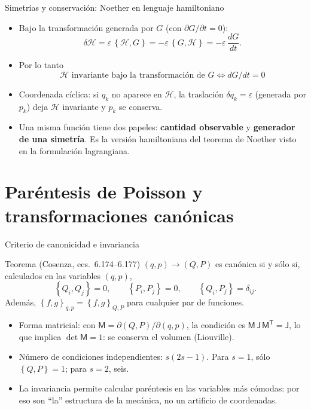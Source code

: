 \documentclass[spanish]{beamer}
\newcommand{\Ham}{\mathcal{H}}
\newcommand{\pb}[2]{\left\{#1,#2\right\}}   %
\newcommand{\J}{\mathsf{J}}                  %
\begin{document}
\begin{frame}{Simetrías y conservación: Noether en lenguaje hamiltoniano}
\begin{itemize}
  \item<1-> Bajo la transformación generada por $G$ (con $\partial G/\partial t = 0$):
  \[
    \delta\Ham = \varepsilon\,\pb{\Ham}{G} = -\varepsilon\,\pb{G}{\Ham}
               = -\varepsilon\,\frac{dG}{dt} .
  \]
  \item<2-> Por lo tanto
  \[
    \boxed{\ \Ham \text{ invariante bajo la transformación de } G
    \iff dG/dt = 0\ }
  \]
  \item<3-> Coordenada cíclica: si $q_k$ no aparece en $\Ham$, la traslación
        $\delta q_k=\varepsilon$ (generada por $p_k$) deja $\Ham$ invariante y
        $p_k$ se conserva.
  \item<4-> Una misma función tiene dos papeles: \textbf{cantidad observable}
        y \textbf{generador de una simetría}. Es la versión hamiltoniana del
        teorema de Noether visto en la formulación lagrangiana.
\end{itemize}
\end{frame}

\section{Paréntesis de Poisson y transformaciones canónicas}

\begin{frame}{Criterio de canonicidad e invariancia}
\begin{block}{Teorema (Cosenza, ecs.~6.174--6.177)}
$(q,p)\to(Q,P)$ es canónica si y sólo si, calculados en las variables $(q,p)$,
\[
  \pb{Q_i}{Q_j} = 0, \qquad \pb{P_i}{P_j} = 0, \qquad \pb{Q_i}{P_j} = \delta_{ij} .
\]
Además, $\pb{f}{g}_{q,p} = \pb{f}{g}_{Q,P}$ para cualquier par de funciones.
\end{block}
\begin{itemize}
  \item<2-> Forma matricial: con $\mathsf M = \partial(Q,P)/\partial(q,p)$, la condición
        es $\mathsf M\,\J\,\mathsf M^{\mathsf T} = \J$, lo que implica
        $\det\mathsf M = 1$: se conserva el volumen (Liouville).
  \item<3-> Número de condiciones independientes: $s(2s-1)$.
        Para $s=1$, sólo $\pb{Q}{P}=1$; para $s=2$, \alert{seis}.
  \item<4-> La invariancia permite calcular paréntesis en las variables más cómodas:
        por eso son ``la'' estructura de la mecánica, no un artificio de coordenadas.
\end{itemize}
\end{frame}
\end{document}
